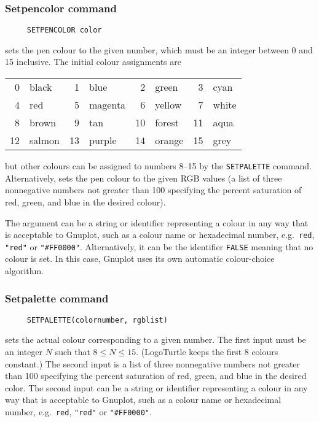 \subsubsection*{Setpencolor command}
\begin{verbatim}
     SETPENCOLOR color
\end{verbatim}
\label{logoturtle:setpencolor}
sets the pen colour to the given number, which must be an integer
between 0 and 15 inclusive.  The initial colour assignments are
\begin{center}
  \begin{tabular}{rlrlrlrl}
    0 & black  &  1 & blue    &  2 & green  &  3 & cyan  \\
    4 & red    &  5 & magenta &  6 & yellow &  7 & white \\
    8 & brown  &  9 & tan     & 10 & forest & 11 & aqua  \\
    12 & salmon & 13 & purple  & 14 & orange & 15 & grey
  \end{tabular}
\end{center}
but other colours can be assigned to numbers 8--15 by the
\texttt{SETPALETTE} command.  Alternatively, sets the pen colour to
the given RGB values (a list of three nonnegative numbers not greater
than 100 specifying the percent saturation of red, green, and blue in
the desired colour).

The argument can be a string or identifier representing a colour in
any way that is acceptable to Gnuplot, such as a colour name or
hexadecimal number, e.g.\ \texttt{red}, \texttt{"red"} or
\texttt{"\#FF0000"}.  Alternatively, it can be the identifier
\texttt{FALSE} meaning that no colour is set.  In this case, Gnuplot
uses its own automatic colour-choice algorithm.

\subsubsection*{Setpalette command}
\begin{verbatim}
     SETPALETTE(colornumber, rgblist)
\end{verbatim}
sets the actual colour corresponding to a given number.  The first
input must be an integer $N$ such that $8 \le N \le 15$. (LogoTurtle
keeps the first 8 colours constant.)  The second input is a list of
three nonnegative numbers not greater than 100 specifying the percent
saturation of red, green, and blue in the desired color.  The second
input can be a string or identifier representing a colour in any way
that is acceptable to Gnuplot, such as a colour name or hexadecimal
number, e.g.\ \texttt{red}, \texttt{"red"} or \texttt{"\#FF0000"}.

